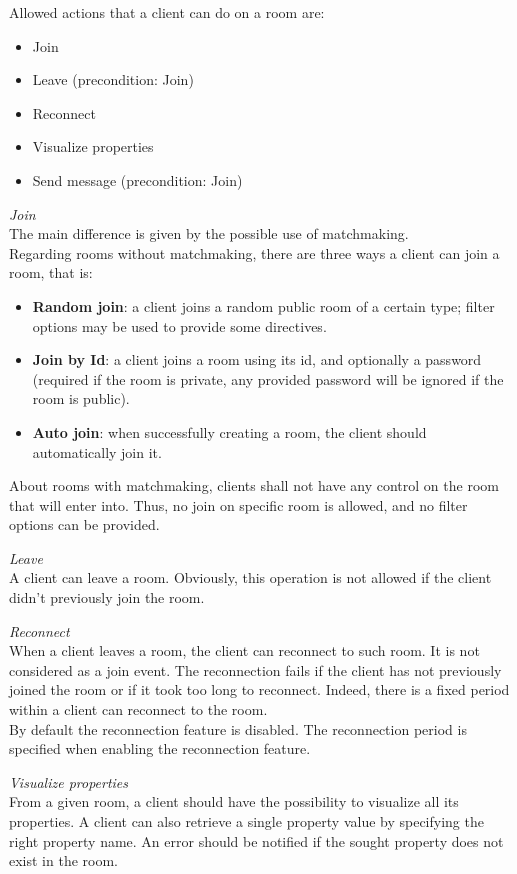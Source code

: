 \bigskip
Allowed actions that a client can do on a room are:
\begin{itemize}
\item Join
\item Leave (precondition: Join)
\item Reconnect
\item Visualize properties
\item Send message (precondition: Join)
\end{itemize}

\bigskip
\textit{Join}
\\
The main difference is given by the possible use of matchmaking.
\\
Regarding rooms without matchmaking, there are three ways a client can join a room, that is:
\begin{itemize}
\item \textbf{Random join}: a client joins a random public room of a certain type; filter options may be used to provide some directives.
\item \textbf{Join by Id}: a client joins a room using its id, and optionally a password (required if the room is private, any provided password will be ignored if the room is public).
\item \textbf{Auto join}: when successfully creating a room, the client should automatically join it.
\end{itemize} 

About rooms with matchmaking, clients shall not have any control on the room that will enter into. Thus, no join on specific room is allowed, and no filter options can be provided. 

\bigskip
\textit{Leave}
\\
A client can leave a room. Obviously, this operation is not allowed if the client didn't previously join the room. 

\bigskip
\textit{Reconnect}
\\
When a client leaves a room, the client can reconnect to such room. It is not considered as a join event.
The reconnection fails if the client has not previously joined the room or if it took too long to reconnect. Indeed, there is a fixed period within a client can reconnect to the room.
\\
By default the reconnection feature is disabled. The reconnection period is specified when enabling the reconnection feature.

\bigskip
\textit{Visualize properties}
\\
From a given room, a client should have the possibility to visualize all its properties. A client can also retrieve a single property value by specifying the right property name. An error should be notified if the sought property does not exist in the room.

